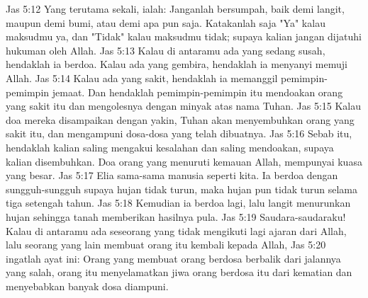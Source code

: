 Jas 5:12  Yang terutama sekali, ialah: Janganlah bersumpah, baik demi langit, maupun demi bumi, atau demi apa pun saja. Katakanlah saja "Ya" kalau maksudmu ya, dan "Tidak" kalau maksudmu tidak; supaya kalian jangan dijatuhi hukuman oleh Allah.
Jas 5:13  Kalau di antaramu ada yang sedang susah, hendaklah ia berdoa. Kalau ada yang gembira, hendaklah ia menyanyi memuji Allah.
Jas 5:14  Kalau ada yang sakit, hendaklah ia memanggil pemimpin-pemimpin jemaat. Dan hendaklah pemimpin-pemimpin itu mendoakan orang yang sakit itu dan mengolesnya dengan minyak atas nama Tuhan.
Jas 5:15  Kalau doa mereka disampaikan dengan yakin, Tuhan akan menyembuhkan orang yang sakit itu, dan mengampuni dosa-dosa yang telah dibuatnya.
Jas 5:16  Sebab itu, hendaklah kalian saling mengakui kesalahan dan saling mendoakan, supaya kalian disembuhkan. Doa orang yang menuruti kemauan Allah, mempunyai kuasa yang besar.
Jas 5:17  Elia sama-sama manusia seperti kita. Ia berdoa dengan sungguh-sungguh supaya hujan tidak turun, maka hujan pun tidak turun selama tiga setengah tahun.
Jas 5:18  Kemudian ia berdoa lagi, lalu langit menurunkan hujan sehingga tanah memberikan hasilnya pula.
Jas 5:19  Saudara-saudaraku! Kalau di antaramu ada seseorang yang tidak mengikuti lagi ajaran dari Allah, lalu seorang yang lain membuat orang itu kembali kepada Allah,
Jas 5:20  ingatlah ayat ini: Orang yang membuat orang berdosa berbalik dari jalannya yang salah, orang itu menyelamatkan jiwa orang berdosa itu dari kematian dan menyebabkan banyak dosa diampuni.



